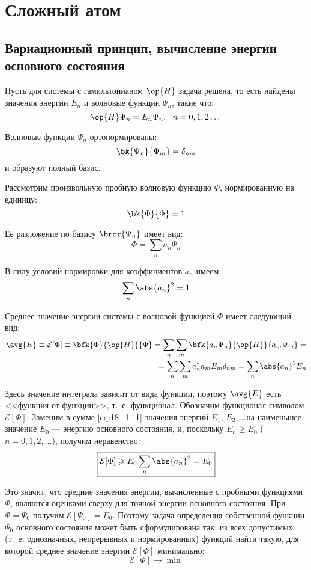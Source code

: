 \chapter{Сложный атом}

\section{Вариационный принцип, вычисление энергии основного состояния}

Пусть для системы с гамильтонианом $\op{H}$ задача решена, то есть найдены значения энергии $E_n$ и волновые функции $\Psi_n$, такие что:
$$
\op{H}\Psi_n = E_n \Psi_n,~~ n = 0,1,2 \dots
$$

Волновые функции $\Psi_n$ ортонормированы:
$$
\bk{\Psi_n}{\Psi_m} = \delta_{nm}
$$
и образуют полный базис.

Рассмотрим произвольную пробную волновую функцию $\Phi$, нормированную на единицу:
$$
\bk{\Phi}{\Phi} = 1
$$

Её разложение по базису $\brcr{\Psi_n}$ имеет вид:
$$
\Phi = \sum_n a_n \Psi_n
$$

В силу условий нормировки для коэффициентов $a_n$ имеем:
$$
\sum_n \abs{a_n}^2 = 1
$$

Среднее значение энергии системы с волновой функцией $\Phi$ имеет следующий вид:
\begin{eqnarray}
\label{eq:18_1_1}
\avg{E} \equiv \mathcal{E}[\Phi] \equiv \bfk{\Phi}{\op{H}}{\Phi}  = \sum_n \sum_m \bfk{a_n \Psi_n}{\op{H}}{a_m \Psi_m} = \nonumber \\ = \sum_n \sum_m a_n^* a_m E_m \delta_{nm} = \sum_n \abs{a_n}^2 E_n
\end{eqnarray}

Здесь значение интеграла зависит от вида функции, поэтому $\avg{E}$ есть <<функция от функции>>, т.~е. \underline{функционал}. Обозначим функционал символом $\mathcal{E}[\Phi]$. Заменим в сумме \eqref{eq:18_1_1} значения энергий $E_1$, $E_2$, \dots на наименьшее значение $E_0$ --- энергию основного состояния, и, поскольку  $E_n \geqslant E_0$ ($n=0, 1, 2, \dots$), получим неравенство:
\begin{equation}
\label{eq:18_1_2}
\boxed{\mathcal{E}[\Phi] \geqslant E_0 \sum_n \abs{a_n}^2 = E_0}
\end{equation}

Это значит, что средние значения энергии, вычисленные с пробными функциями $\Phi$, являются оценками сверху для точной энергии основного состояния. При $\Phi = \Psi_0$ получим $\mathcal{E}[\Psi_0] = E_0$.
Поэтому задача определения собственной функции $\Psi_0$ основного состояния может быть сформулирована так: из всех допустимых (т.~е. однозначных, непрерывных и нормированных) функций найти такую, для которой среднее значение энергии $\mathcal{E}[\Phi]$ минимально:
\begin{equation}
\label{eq:18_1_3}
\mathcal{E}[\Phi] \to \min
\end{equation}

